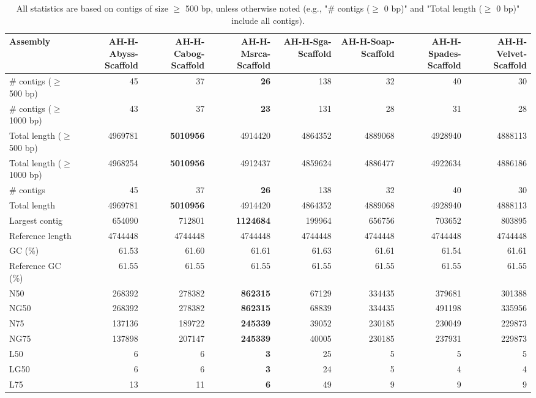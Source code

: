 \documentclass[12pt,a4paper]{article}
\begin{document}
\begin{table}[ht]
\begin{center}
\caption{All statistics are based on contigs of size $\geq$ 500 bp, unless otherwise noted (e.g., "\# contigs ($\geq$ 0 bp)" and "Total length ($\geq$ 0 bp)" include all contigs).}
\begin{tabular}{|l*{7}{|r}|}
\hline
Assembly & AH-H-Abyss-Scaffold & AH-H-Cabog-Scaffold & AH-H-Msrca-Scaffold & AH-H-Sga-Scaffold & AH-H-Soap-Scaffold & AH-H-Spades-Scaffold & AH-H-Velvet-Scaffold \\ \hline
\# contigs ($\geq$ 500 bp) & 45 & 37 & {\bf 26} & 138 & 32 & 40 & 30 \\ \hline
\# contigs ($\geq$ 1000 bp) & 43 & 37 & {\bf 23} & 131 & 28 & 31 & 28 \\ \hline
Total length ($\geq$ 500 bp) & 4969781 & {\bf 5010956} & 4914420 & 4864352 & 4889068 & 4928940 & 4888113 \\ \hline
Total length ($\geq$ 1000 bp) & 4968254 & {\bf 5010956} & 4912437 & 4859624 & 4886477 & 4922634 & 4886186 \\ \hline
\# contigs & 45 & 37 & {\bf 26} & 138 & 32 & 40 & 30 \\ \hline
Total length & 4969781 & {\bf 5010956} & 4914420 & 4864352 & 4889068 & 4928940 & 4888113 \\ \hline
Largest contig & 654090 & 712801 & {\bf 1124684} & 199964 & 656756 & 703652 & 803895 \\ \hline
Reference length & 4744448 & 4744448 & 4744448 & 4744448 & 4744448 & 4744448 & 4744448 \\ \hline
GC (\%) & 61.53 & 61.60 & 61.61 & 61.63 & 61.61 & 61.54 & 61.61 \\ \hline
Reference GC (\%) & 61.55 & 61.55 & 61.55 & 61.55 & 61.55 & 61.55 & 61.55 \\ \hline
N50 & 268392 & 278382 & {\bf 862315} & 67129 & 334435 & 379681 & 301388 \\ \hline
NG50 & 268392 & 278382 & {\bf 862315} & 68839 & 334435 & 491198 & 335956 \\ \hline
N75 & 137136 & 189722 & {\bf 245339} & 39052 & 230185 & 230049 & 229873 \\ \hline
NG75 & 137898 & 207147 & {\bf 245339} & 40005 & 230185 & 237931 & 229873 \\ \hline
L50 & 6 & 6 & {\bf 3} & 25 & 5 & 5 & 5 \\ \hline
LG50 & 6 & 6 & {\bf 3} & 24 & 5 & 4 & 4 \\ \hline
L75 & 13 & 11 & {\bf 6} & 49 & 9 & 9 & 9 \\ \hline

\end{tabular}
\end{center}
\end{table}
\end{document}
